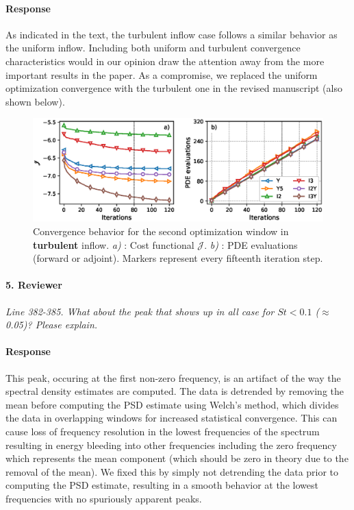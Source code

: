 \documentclass[]{article}
\newcommand{\revision}[1]{\textbf{#1}}
\begin{document}
\paragraph{Response} As indicated in the text, the turbulent inflow case follows a similar behavior as the uniform inflow. Including both uniform and turbulent convergence characteristics would in our opinion draw the attention away from the more important results in the paper. As a compromise, we replaced the uniform optimization convergence with the turbulent one in the revised manuscript (also shown below).

\begin{figure}[h]
	\includegraphics[width=\textwidth]{figure4_revised}
	\caption{Convergence behavior for the second optimization window in \revision{turbulent} inflow. \emph{a) }: Cost functional $\mathscr{J}$. \emph{b) }: PDE evaluations (forward or adjoint). Markers represent every fifteenth iteration step.}
\end{figure} 

\hrulefill

\paragraph{5. Reviewer} \textit{Line 382-385. What about the peak that shows up in all case for $St < 0.1$ ($\approx$ 0.05)? Please explain.}

\paragraph{Response} This peak, occuring at the first non-zero frequency, is an artifact of the way the spectral density estimates are computed. The data is detrended by removing the mean before computing the PSD estimate using Welch's method, which divides the data in overlapping windows for increased statistical convergence. This can cause loss of frequency resolution in the lowest frequencies of the spectrum resulting in energy bleeding into other frequencies including the zero frequency which represents the mean component (which should be zero in theory due to the removal of the mean). We fixed this by simply not detrending the data prior to computing the PSD estimate, resulting in a smooth behavior at the lowest frequencies with no spuriously apparent peaks. 
\end{document}
